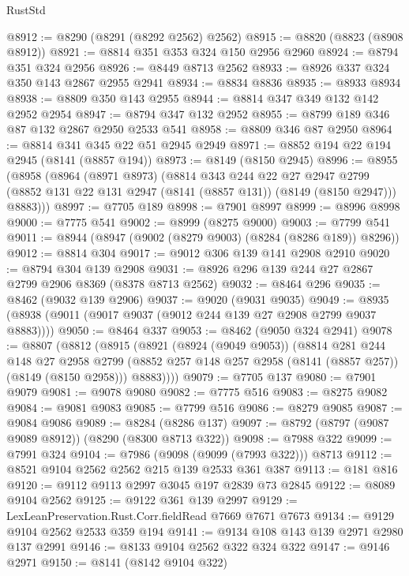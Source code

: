 \begin{lexlean}{RustStd}
\begin{coremodule}
@8912 := @8290 (@8291 (@8292 @2562) @2562)
@8915 := @8820 (@8823 (@8908 @8912))
@8921 := @8814 @351 @353 @324 @150 @2956 @2960
@8924 := @8794 @351 @324 @2956
@8926 := @8449 @8713 @2562
@8933 := @8926 @337 @324 @350 @143 @2867 @2955 @2941
@8934 := @8834 @8836
@8935 := @8933 @8934
@8938 := @8809 @350 @143 @2955
@8944 := @8814 @347 @349 @132 @142 @2952 @2954
@8947 := @8794 @347 @132 @2952
@8955 := @8799 @189 @346 @87 @132 @2867 @2950 @2533 @541
@8958 := @8809 @346 @87 @2950
@8964 := @8814 @341 @345 @22 @51 @2945 @2949
@8971 := @8852 @194 @22 @194 @2945 (@8141 (@8857 @194))
@8973 := @8149 (@8150 @2945)
@8996 := @8955
    (@8958
      (@8964
        (@8971 @8973)
        (@8814
          @343
          @244
          @22
          @27
          @2947
          @2799
          (@8852 @131 @22 @131 @2947 (@8141 (@8857 @131)) (@8149 (@8150 @2947)))
          @8883)))
@8997 := @7705 @189
@8998 := @7901 @8997
@8999 := @8996 @8998
@9000 := @7775 @541
@9002 := @8999 (@8275 @9000)
@9003 := @7799 @541
@9011 := @8944 (@8947 (@9002 (@8279 @9003) (@8284 (@8286 @189)) @8296))
@9012 := @8814 @304
@9017 := @9012 @306 @139 @141 @2908 @2910
@9020 := @8794 @304 @139 @2908
@9031 := @8926 @296 @139 @244 @27 @2867 @2799 @2906 @8369 (@8378 @8713 @2562)
@9032 := @8464 @296
@9035 := @8462 (@9032 @139 @2906)
@9037 := @9020 (@9031 @9035)
@9049 := @8935 (@8938 (@9011 (@9017 @9037 (@9012 @244 @139 @27 @2908 @2799 @9037 @8883))))
@9050 := @8464 @337
@9053 := @8462 (@9050 @324 @2941)
@9078 := @8807
    (@8812
      (@8915
        (@8921
          (@8924 (@9049 @9053))
          (@8814
            @281
            @244
            @148
            @27
            @2958
            @2799
            (@8852 @257 @148 @257 @2958 (@8141 (@8857 @257)) (@8149 (@8150 @2958)))
            @8883))))
@9079 := @7705 @137
@9080 := @7901 @9079
@9081 := @9078 @9080
@9082 := @7775 @516
@9083 := @8275 @9082
@9084 := @9081 @9083
@9085 := @7799 @516
@9086 := @8279 @9085
@9087 := @9084 @9086
@9089 := @8284 (@8286 @137)
@9097 := @8792 (@8797 (@9087 @9089 @8912)) (@8290 (@8300 @8713 @322))
@9098 := @7988 @322
@9099 := @7991 @324
@9104 := @7986 (@9098 (@9099 (@7993 @322))) @8713
@9112 := @8521 @9104 @2562 @2562 @215 @139 @2533 @361 @387
@9113 := @181 @816
@9120 := @9112 @9113 @2997 @3045 @197 @2839 @73 @2845
@9122 := @8089 @9104 @2562
@9125 := @9122 @361 @139 @2997
@9129 := LexLeanPreservation.Rust.Corr.fieldRead @7669 @7671 @7673
@9134 := @9129 @9104 @2562 @2533 @359 @194
@9141 := @9134 @108 @143 @139 @2971 @2980 @137 @2991
@9146 := @8133 @9104 @2562 @322 @324 @322
@9147 := @9146 @2971
@9150 := @8141 (@8142 @9104 @322)

\end{coremodule}
\end{lexlean}
